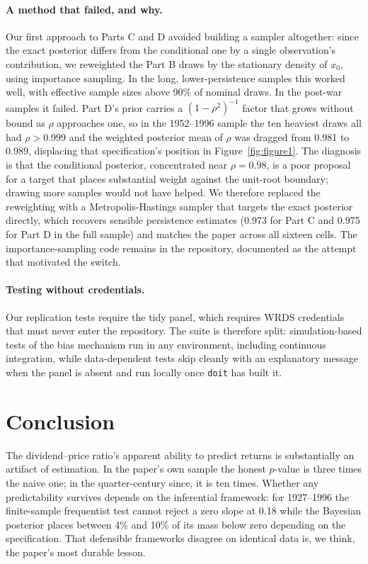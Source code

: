 \documentclass[11pt]{article}
\begin{document}
\paragraph{A method that failed, and why.} Our first approach to Parts C and D
avoided building a sampler altogether: since the exact posterior differs from
the conditional one by a single observation's contribution, we reweighted the
Part B draws by the stationary density of $x_0$, using importance sampling. In
the long, lower-persistence samples this worked well, with effective sample
sizes above 90\% of nominal draws. In the post-war samples it failed. Part D's
prior carries a $(1-\rho^2)^{-1}$ factor that grows without bound as $\rho$
approaches one, so in the 1952--1996 sample the ten heaviest draws all had
$\rho > 0.999$ and the weighted posterior mean of $\rho$ was dragged from 0.981
to 0.989, displacing that specification's position in Figure~\ref{fig:figure1}. 
The diagnosis is that the conditional posterior,
concentrated near $\rho = 0.98$, is a poor proposal for a target that places
substantial weight against the unit-root boundary; drawing more samples would
not have helped. We therefore replaced the reweighting with a
Metropolis-Hastings sampler that targets the exact posterior directly, which
recovers sensible persistence estimates (0.973 for Part C and 0.975 for Part D
in the full sample) and matches the paper across all sixteen cells. The
importance-sampling code remains in the repository, documented as the attempt
that motivated the switch.

\paragraph{Testing without credentials.} Our replication tests require the tidy
panel, which requires WRDS credentials that must never enter the repository.
The suite is therefore split: simulation-based tests of the bias mechanism run
in any environment, including continuous integration, while data-dependent
tests skip cleanly with an explanatory message when the panel is absent and run
locally once \texttt{doit} has built it.

\section{Conclusion}

The dividend--price ratio's apparent ability to predict returns is
substantially an artifact of estimation. In the paper's own sample the honest
$p$-value is three times the naive one; in the quarter-century since, it is ten
times. Whether any predictability survives depends on the inferential framework:
for 1927--1996 the finite-sample frequentist test cannot reject a zero slope at
0.18 while the Bayesian posterior places between 4\% and 10\% of its mass below
zero depending on the specification. That defensible frameworks disagree on
identical data is, we think, the paper's most durable lesson.
\end{document}
